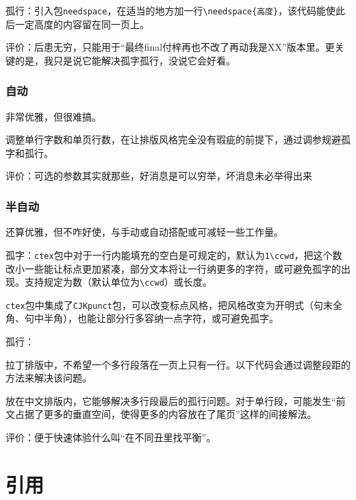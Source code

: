 \documentclass[10pt,openany]{book}
\begin{document}
\begin{sloppypar}
孤行：引入包\texttt{needspace}，在适当的地方加一行\texttt{\textbackslash{}needspace\{高度\}}，该代码能使此后一定高度的内容留在同一页上。

评价：后患无穷，只能用于“最终final付梓再也不改了再动我是XX”版本里。更关键的是，我只是说它能解决孤字孤行，没说它会好看。

\subsection{自动}

非常优雅，但很难搞。

调整单行字数和单页行数，在让排版风格完全没有瑕疵的前提下，通过调参规避孤字和孤行。

评价：可选的参数其实就那些，好消息是可以穷举，坏消息未必举得出来

\subsection{半自动}

还算优雅，但不咋好使，与手动或自动搭配或可减轻一些工作量。

孤字：\texttt{ctex}包中对于一行内能填充的空白是可规定的，默认为\texttt{1\textbackslash{}ccwd}，把这个数改小一些能让标点更加紧凑，部分文本将让一行纳更多的字符，或可避免孤字的出现。支持规定为数（默认单位为\texttt{\textbackslash{}ccwd}）或长度。



\texttt{ctex}包中集成了\texttt{CJKpunct}包，可以改变标点风格，把风格改变为开明式（句末全角、句中半角），也能让部分行多容纳一点字符，或可避免孤字。



孤行：

拉丁排版中，不希望一个多行段落在一页上只有一行。以下代码会通过调整段距的方法来解决该问题。



放在中文排版内，它能够解决多行段最后的孤行问题。对于单行段，可能发生“前文占据了更多的垂直空间，使得更多的内容放在了尾页”这样的间接解法。

评价：便于快速体验什么叫“在不同丑里找平衡”。

\chapter{引用}


\end{sloppypar}
\end{document}
